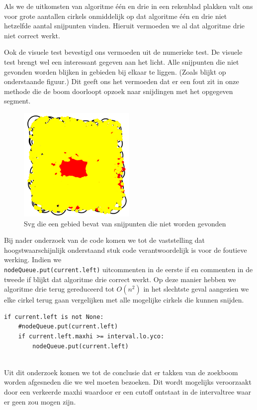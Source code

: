 \documentclass[11pt,a4paper]{article}
\begin{document}
Als we de uitkomsten van algoritme \'e\'en en drie in een rekenblad plakken valt ons voor grote aantallen cirkels onmiddelijk op dat algoritme \'e\'en en drie niet hetzelfde aantal snijpunten vinden. Hieruit vermoeden we al dat algoritme drie niet correct werkt.

Ook de visuele test bevestigd ons vermoeden uit de numerieke test. De visuele test brengt wel een interessant gegeven aan het licht. Alle snijpunten die niet gevonden worden blijken in gebieden bij elkaar te liggen. (Zoals blijkt op onderstaande figuur.) Dit geeft ons het vermoeden dat er een fout zit in onze methode die de boom doorloopt opzoek naar snijdingen met het opgegeven segment.

\begin{figure}[H]
\centering
\includegraphics[width=0.5\textwidth]{gat_midden.png}
\caption*{Svg die een gebied bevat van snijpunten die niet worden gevonden}
\end{figure}

Bij nader onderzoek van de code komen we tot de vaststelling dat hoogstwaarschijnlijk onderstaand stuk code verantwoordelijk is voor de foutieve werking. Indien we \\ \verb|nodeQueue.put(current.left)| uitcommenten in de eerste if en commenten in de tweede if blijkt dat algoritme drie correct werkt. Op deze manier hebben we algoritme drie terug gereduceerd tot $O(n^{2})$ in het slechtste geval aangezien we elke cirkel terug gaan vergelijken met alle mogelijke cirkels die kunnen snijden.

\begin{verbatim}
if current.left is not None:
    #nodeQueue.put(current.left)
    if current.left.maxhi >= interval.lo.yco:
        nodeQueue.put(current.left)
                
\end{verbatim}
Uit dit onderzoek komen we tot de conclusie dat er takken van de zoekboom worden afgesneden die we wel moeten bezoeken. Dit wordt mogelijks veroorzaakt door een verkeerde maxhi waardoor er een cutoff ontstaat in de intervaltree waar er geen zou mogen zijn.
\end{document}
